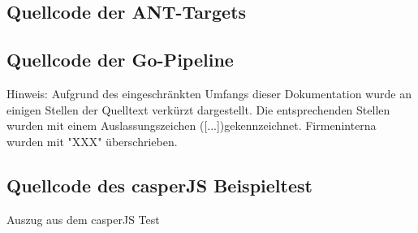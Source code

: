 % 
% 
% 
% 

% 


\subsection{Quellcode der ANT-Targets}
\label{app:anttargets}


\subsection{Quellcode der Go-Pipeline}
Hinweis: Aufgrund des eingeschränkten Umfangs dieser Dokumentation wurde an einigen Stellen der Quelltext verkürzt dargestellt. Die entsprechenden Stellen wurden mit einem Auslassungszeichen ([...])gekennzeichnet. Firmeninterna wurden mit "XXX" überschrieben.
\label{app:casperpipeline}



\subsection{Quellcode des casperJS Beispieltest}
Auszug aus dem casperJS Test
\label{app:casperjstest}


% 
